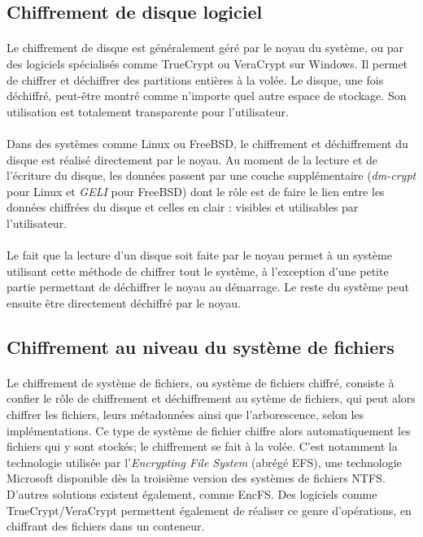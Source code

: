 \subsection{Chiffrement de disque logiciel}
\paragraph{}
Le chiffrement de disque est généralement géré par le noyau du système, ou par
des logiciels spécialisés comme TrueCrypt ou VeraCrypt sur Windows. Il permet de
chiffrer et déchiffrer des partitions entières à la volée. Le disque, une fois
déchiffré, peut-être montré comme n'importe quel autre espace de stockage. Son
utilisation est totalement transparente pour l'utilisateur.
\paragraph{}
Dans des systèmes comme Linux ou FreeBSD, le chiffrement et déchiffrement du
disque est réalisé directement par le noyau. Au moment de la lecture et de
l'écriture du disque, les données passent par une couche supplémentaire
(\textit{dm-crypt} pour Linux et \textit{GELI}\cite{manGeli} pour FreeBSD) dont
le rôle est de faire le lien entre les données chiffrées du disque et celles en
clair : visibles et utilisables par l'utilisateur.
\paragraph{}
Le fait que la lecture d'un disque soit faite par le noyau permet à un système
utilisant cette méthode de chiffrer tout le système, à l'exception d'une petite
partie permettant de déchiffrer le noyau au démarrage. Le reste du système peut
ensuite être directement déchiffré par le noyau.

\subsection{Chiffrement au niveau du système de fichiers}
\paragraph{}
Le chiffrement de système de fichiers, ou système de fichiers chiffré, consiste
à confier le rôle de chiffrement et déchiffrement au sytème de fichiers, qui
peut alors chiffrer les fichiers, leurs métadonnées ainsi que l'arborescence,
selon les implémentations. Ce type de système de fichier chiffre alors
automatiquement les fichiers qui y sont stockés; le chiffrement se fait à la
volée. C'est notamment la technologie utilisée par l'\textit{Encrypting File
  System} (abrégé EFS), une technologie Microsoft disponible dès la troisième
version des systèmes de fichiers NTFS. D'autres solutions existent également,
comme EncFS. Des logiciels comme TrueCrypt/VeraCrypt permettent également de
réaliser ce genre d'opérations, en chiffrant des fichiers dans un conteneur.
